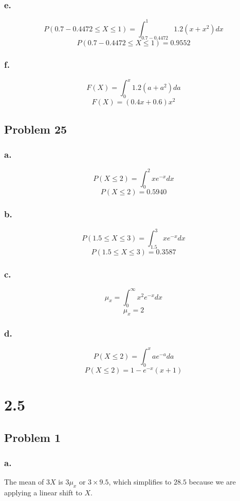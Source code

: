 \documentclass[11pt]{article}
\begin{document}
\subsubsection{e.}
\[ P(0.7 - 0.4472 \le X\le 1) = \int_{0.7 - 0.4472}^{1} 1.2(x+x^2) dx \]
\[ P(0.7 - 0.4472 \le X\le 1) = 0.9552 \]


\subsubsection{f.}
\[ F(X) = \int_{0}^{x} 1.2(a+a^2) da \]
\[ F(X) = (0.4x + 0.6) x^2  \]

\subsection{Problem 25}
\subsubsection{a.}
\[P(X\le2) = \int_{0}^{2}xe^{-x} dx \]
\[P(X\le2) = 0.5940 \]

\subsubsection{b.}
\[ P(1.5 \le X \le 3) = \int_{1.5}^{3}xe^{-x} dx \]
\[ P(1.5 \le X \le 3) = 0.3587 \]

\subsubsection{c.}
\[ \mu_x = \int_{0}^{\infty}x^2e^{-x} dx \]
\[ \mu_x = 2 \]

\subsubsection{d.}
\[P(X\le2) = \int_{0}^{x}ae^{-a} da \]
\[P(X\le2) = 1 - e^{-x}(x+1) \]

\section{2.5}
\subsection{Problem 1}
\subsubsection{a.}
The mean of $3X$ is $3\mu_x$ or $3\times 9.5$, which simplifies to $28.5$
because we are applying a linear shift to $X$.
\end{document}
